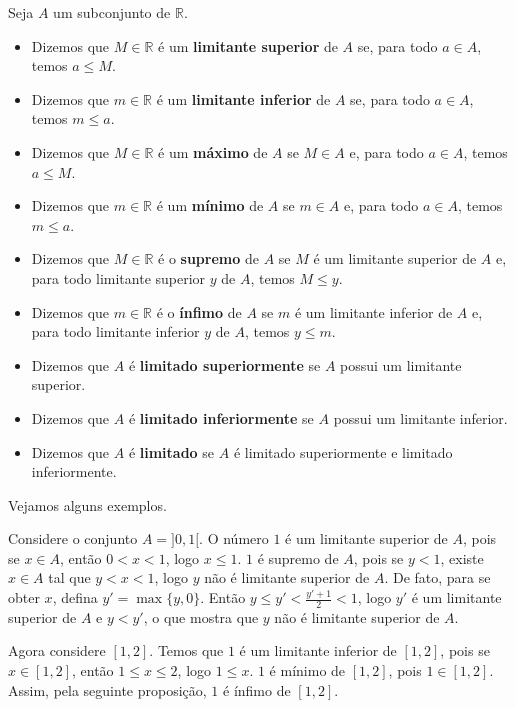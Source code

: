 \begin{definition}Seja $A$ um subconjunto de $\mathbb R$.
\begin{itemize}
\item Dizemos que $M\in\mathbb R$ é um \textbf{limitante superior} de $A$ se, para todo $a\in A$, temos $a\leq M$.
\item Dizemos que $m\in\mathbb R$ é um \textbf{limitante inferior} de $A$ se, para todo $a\in A$, temos $m\leq a$.
\item Dizemos que $M\in\mathbb R$ é um \textbf{máximo} de $A$ se $M\in A$ e, para todo $a\in A$, temos $a\leq M$.
\item Dizemos que $m\in\mathbb R$ é um \textbf{mínimo} de $A$ se $m\in A$ e, para todo $a\in A$, temos $m\leq a$.
\item Dizemos que $M\in\mathbb R$ é o \textbf{supremo} de $A$ se $M$ é um limitante superior de $A$ e, para todo limitante superior $y$ de $A$, temos $M\leq y$.
\item Dizemos que $m\in\mathbb R$ é o \textbf{ínfimo} de $A$ se $m$ é um limitante inferior de $A$ e, para todo limitante inferior $y$ de $A$, temos $y\leq m$.
\item Dizemos que $A$ é \textbf{limitado superiormente} se $A$ possui um limitante superior.
\item Dizemos que $A$ é \textbf{limitado inferiormente} se $A$ possui um limitante inferior.
\item Dizemos que $A$ é \textbf{limitado} se $A$ é limitado superiormente e limitado inferiormente.
\end{itemize}
\end{definition}

Vejamos alguns exemplos.
\begin{example}
Considere o conjunto $A=]0,1[$.
O número $1$ é um limitante superior de $A$, pois se $x\in A$, então $0<x<1$, logo $x\leq 1$.
$1$ é supremo de $A$, pois se $y<1$, existe $x\in A$ tal que $y<x<1$, logo $y$ não é limitante superior de $A$.
De fato, para se obter $x$, defina $y'=\max\{y, 0\}$.
Então $y\leq y'<\frac{y'+1}{2}<1$, logo $y'$ é um limitante superior de $A$ e $y<y'$, o que mostra que $y$ não é limitante superior de $A$.

Agora considere $[1, 2]$.
Temos que $1$ é um limitante inferior de $[1, 2]$, pois se $x\in [1, 2]$, então $1\leq x\leq 2$, logo $1\leq x$.
$1$ é mínimo de $[1, 2]$, pois $1\in [1, 2]$.
Assim, pela seguinte proposição, $1$ é ínfimo de $[1, 2]$.
\end{example}